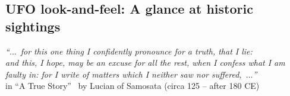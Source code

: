 %
%
%

\begin{partbacktext}
\part{UFO look-and-feel: A glance at historic sightings}
\noindent

\begin{flushright}
{\em ``$\ldots$~for this one thing I confidently pronounce for a truth, that I lie:\\
and this, I hope, may be an excuse for all the rest, when I confess what I am faulty in:
for I write of matters which I neither saw nor suffered,~$\ldots$''} \\
in ``A True Story''~\cite{LucianofSamosata} by Lucian of Samosata (circa 125 -- after 180 CE)
\end{flushright}


\end{partbacktext}
